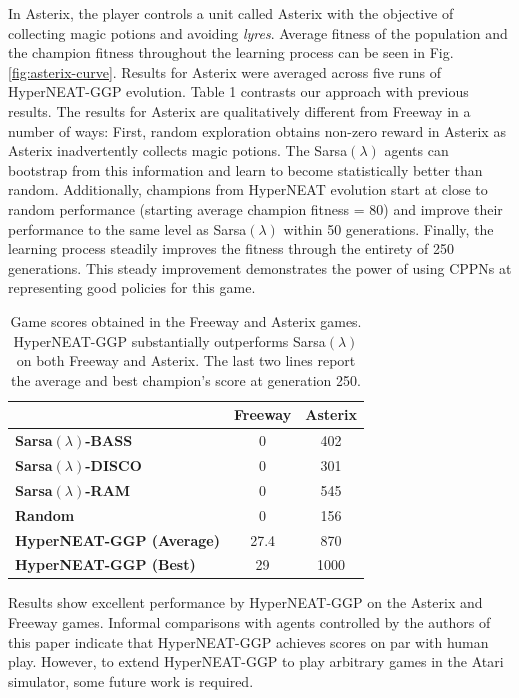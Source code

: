 \documentclass{sig-alternate}
\begin{document}
In Asterix, the player controls a unit called Asterix with the objective of collecting magic potions and avoiding \textit{lyres}. Average fitness of the population and the champion fitness throughout the learning process can be seen in Fig. \ref{fig:asterix-curve}. Results for Asterix were averaged across five runs of HyperNEAT-GGP evolution. Table 1 contrasts our approach with previous results. The results for Asterix are qualitatively different from Freeway in a number of ways: First, random exploration obtains non-zero reward in Asterix as Asterix inadvertently collects magic potions. The Sarsa$(\lambda)$ agents can bootstrap from this information and learn to become statistically better than random. Additionally, champions from HyperNEAT evolution start at close to random performance (starting average champion fitness = 80) and improve their performance to the same level as Sarsa$(\lambda)$ within 50 generations. Finally, the learning process steadily improves the fitness through the entirety of 250 generations. This steady improvement demonstrates the power of using CPPNs at representing good policies for this game.

\begin{table}
\begin{center}
\begin{tabular}{|l|c|c|}
\hline
~ & \textbf{Freeway} & \textbf{Asterix} \\ \hline
\textbf{Sarsa$(\lambda)$-BASS} & 0 & 402 \\ \hline
\textbf{Sarsa$(\lambda)$-DISCO} & 0 & 301 \\ \hline
\textbf{Sarsa$(\lambda)$-RAM} & 0 & 545 \\ \hline
\textbf{Random} & 0 & 156 \\ \hline
\textbf{HyperNEAT-GGP (Average)} & 27.4 & 870 \\ \hline
\textbf{HyperNEAT-GGP (Best)} & 29 & 1000 \\ 
\hline
\end{tabular}
\end{center}
\caption{Game scores obtained in the Freeway and Asterix games. HyperNEAT-GGP substantially outperforms Sarsa$(\lambda)$ on both Freeway and Asterix. The last two lines report the average and best champion's score at generation 250.}
\end{table}

Results show excellent performance by HyperNEAT-GGP on the Asterix and Freeway games. Informal comparisons with agents controlled by the authors of this paper indicate that HyperNEAT-GGP achieves scores on par with human play. However, to extend HyperNEAT-GGP to play arbitrary games in the Atari simulator, some future work is required.
\end{document}
